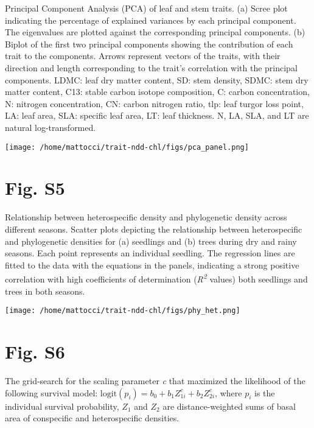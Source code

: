 \documentclass[
  12pt,
  letterpaper,
  DIV=11,
  numbers=noendperiod]{scrartcl}
\begin{document}
Principal Component Analysis (PCA) of leaf and stem traits. (a) Scree
plot indicating the percentage of explained variances by each principal
component. The eigenvalues are plotted against the corresponding
principal components. (b) Biplot of the first two principal components
showing the contribution of each trait to the components. Arrows
represent vectors of the traits, with their direction and length
corresponding to the trait's correlation with the principal components.
LDMC: leaf dry matter content, SD: stem density, SDMC: stem dry matter
content, C13: stable carbon isotope composition, C: carbon
concentration, N: nitrogen concentration, CN: carbon nitrogen ratio,
tlp: leaf turgor loss point, LA: leaf area, SLA: specific leaf area, LT:
leaf thickness. N, LA, SLA, and LT are natural log-transformed.

\texttt{[image: /home/mattocci/trait-ndd-chl/figs/pca\_panel.png]}

\newpage

\hypertarget{fig.-s5}{%
\section{Fig. S5}\label{fig.-s5}}

Relationship between heterospecific density and phylogenetic density
across different seasons. Scatter plots depicting the relationship
between heterospecific and phylogenetic densities for (a) seedlings and
(b) trees during dry and rainy seasons. Each point represents an
individual seedling. The regression lines are fitted to the data with
the equations in the panels, indicating a strong positive correlation
with high coefficients of determination (\emph{R\textsuperscript{2}}
values) both seedlings and trees in both seasons.

\texttt{[image: /home/mattocci/trait-ndd-chl/figs/phy\_het.png]}

\newpage

\hypertarget{fig.-s6}{%
\section{Fig. S6}\label{fig.-s6}}

The grid-search for the scaling parameter \emph{c} that maximized the
likelihood of the following survival model:
\(\mathrm{logit}(p_i) = b_0 + b_1 Z_{1i}^c + b_2 Z_{2i}^c\), where
\(p_i\) is the individual survival probability, \(Z_1\) and \(Z_2\) are
distance-weighted sums of basal area of conspecific and heterospecific
densities.
\end{document}
